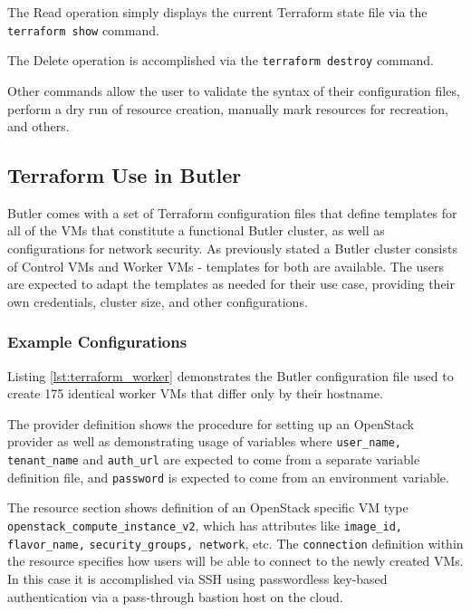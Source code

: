 The Read operation simply displays the current Terraform state file via the \texttt{terraform show} command.

The Delete operation is accomplished via the \texttt{terraform destroy} command.

Other commands allow the user to validate the syntax of their configuration files, perform a dry run of resource creation, manually mark resources for recreation, and others.

\subsection {Terraform Use in Butler}

Butler comes with a set of Terraform configuration files that define templates for all of the VMs that constitute a functional Butler cluster, as well as configurations for network security. As previously stated a Butler cluster consists of Control VMs and Worker VMs - templates for both are available. The users are expected to adapt the templates as needed for their use case, providing their own credentials, cluster size, and other configurations.

\subsubsection {Example Configurations}


Listing \ref{lst:terraform_worker} demonstrates the Butler configuration file used to create 175 identical worker VMs that differ only by their hostname. 

The provider definition shows the procedure for setting up an OpenStack provider as well as demonstrating usage of variables where \texttt{user_name, tenant_name} and \texttt{auth_url} are expected to come from a separate variable definition file, and  \texttt{password} is expected to come from an environment variable. 

The resource section shows definition of an OpenStack specific VM type \texttt{openstack_compute_instance_v2}, which has attributes like \texttt{image_id,} \\\texttt{flavor_name,} \texttt{security_groups, network}, etc. The  \texttt{connection} definition within the resource specifies how users will be able to connect to the newly created VMs. In this case it is accomplished via SSH using passwordless key-based authentication via a pass-through bastion host on the cloud.

